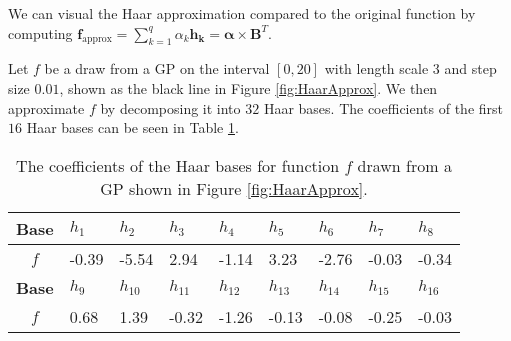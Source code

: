 \documentclass[12pt]{book} %
\begin{document}
We can visual the Haar approximation compared to the original function by  computing $\mathbf{f_{\mathrm{approx}}} = \sum^q_{k=1} \alpha_k \mathbf{h_k} = \bm{\alpha} \times \mathbf{B}^T$.

 
Let $f$ be a draw from a GP on the interval $[0,20]$ with length scale $3$ and step size $0.01$, shown as the black line in Figure \ref{fig:HaarApprox}. We then approximate $f$ by decomposing it into $32$ Haar bases. The coefficients of the first $16$ Haar bases can be seen in Table \ref{table:HaarCoef}.

\begin{table}[h!]
  \begin{center}
    \label{table:Haar}
    \begin{tabular}{|c|l|l|l|l|l|l|l|l|}
    \hline
      \textbf{Base} & $h_{1}$ & $h_{2}$ & $h_{3}$  & $h_{4}$ & $h_{5}$ & $h_{6}$ & $h_{7}$ & $h_{8}$ \\ 
      \hline
     $f$ &-0.39 & -5.54 & 2.94 & -1.14 & 3.23 & -2.76 & -0.03 & -0.34  \\ \hline
     \hline
 \textbf{Base} & $h_{9}$ & $h_{10}$ & $h_{11}$  & $h_{12}$ & $h_{13}$ & $h_{14}$ & $h_{15}$ & $h_{16}$ \\ \hline
 	 $f$ & 0.68 & 1.39& -0.32& -1.26& -0.13& -0.08& -0.25& -0.03  \\ \hline
    \end{tabular}
    \caption{The coefficients of the Haar bases for function $f$ drawn from a GP shown in Figure \ref{fig:HaarApprox}. }
    \label{table:HaarCoef}
  \end{center}
\end{table} 
\end{document}
